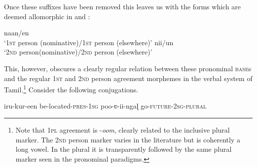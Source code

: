 \documentclass[output=paper]{langscibook}
\begin{document}
Once these suffixes have been removed this leaves us with the forms which are deemed allomorphic in \citet{Moskal2015} and \citet{moskal2016towards}:

\begin{exe}
\ex \label{new4}
\begin{xlist}
\ex \label{new4a}
naan/en\\‘1\textsc{st} person (nominative)/1\textsc{st} person (elsewhere)’
\ex \label{new4b}
nii/un\\‘2\textsc{nd} person(nominative)/2\textsc{nd} person (elsewhere)’
\end{xlist}
\end{exe}

This, however, obscures a clearly regular relation between these pronominal \textsc{base}s and the regular 1\textsc{st} and 2\textsc{nd} person agreement morphemes in the verbal system of Tamil.\footnote{Note that 1\textsc{pl} agreement is -\textit{oom}, clearly related to the inclusive plural marker. The 2\textsc{nd} person marker varies in the literature but is coherently a long vowel. In the plural it is transparently followed by the same plural marker seen in the pronominal paradigms.}  Consider the following conjugations.\largerpage[-1.5]

\begin{exe}
\ex \label{new5}
\begin{xlist}
\ex \label{new5a}
iru-kur-een \jambox{[irukkreen]}
be-located-\textsc{pres}-1\textsc{sg} 
\ex \label{new5b}
poo-ʋ-ii-ngaɭ \jambox{[pooʋiinga]} 
go-\textsc{future}-2\textsc{sg}-\textsc{plural}
\end{xlist}
\end{exe}
\end{document}
